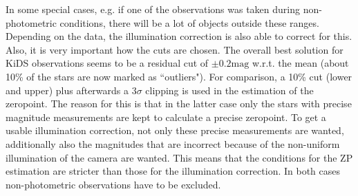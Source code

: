 In some special cases, e.g. if one of the observations was taken during non-photometric conditions, there will be a lot of objects outside these ranges. Depending on the data, the illumination correction is also able to correct for this.\\
Also, it is very important how the cuts are chosen. The overall best solution for KiDS observations seems to be a residual cut of $\pm 0.2\text{mag}$ w.r.t. the mean (about 10\% of the stars are now marked as ``outliers"). For comparison, a 10\% cut (lower and upper) plus afterwards a 3$\sigma$ clipping is used in the estimation of the zeropoint. The reason for this is that in the latter case only the stars with precise magnitude measurements are kept to calculate a precise zeropoint. To get a usable illumination correction, not only these precise measurements are wanted, additionally also the magnitudes that are incorrect because of the non-uniform illumination of the camera are wanted. This means that the conditions for the ZP estimation are stricter than those for the illumination correction. In both cases non-photometric observations have to be excluded.
